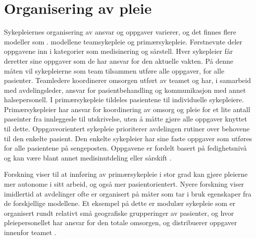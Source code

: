 \section{Organisering av pleie}
\label{sec:pleie}

Sykepleiernes organisering av ansvar og oppgaver varierer, og det finnes flere modeller som .  modellene teamsykepleie og primærsykepleie. Førstnevnte deler oppgavene inn i kategorier som medisinering og sårstell. Hver sykepleier får deretter sine oppgaver som de har ansvar for den aktuelle vakten. På denne måten vil sykepleierne som team tilsammen utføre alle oppgaver, for alle pasienter. Teamledere koordinerer omsorgen utført av teamet og har, i samarbeid med avdelingsleder, ansvar for pasientbehandling og kommunikasjon med annet halsepersonell. I primærsykepleie tildeles pasientene til individuelle sykepleiere. Primærsykepleier har ansvar for koordinering av omsorg og pleie for et lite antall paseinter fra innleggesle til utskrivelse, uten å måtte gjøre alle oppgaver knyttet til dette. Oppgaveorientert sykepleie prioriterer avdelingen rutiner over behovene til den enkelte pasient. Den enkelte sykepleier har sine faste oppgaver som utføres for alle pasientene på sengeposten. Oppgavene er fordelt basert på fedighetsnivå og kan være blant annet medisinutdeling eller sårskift \citep{Rygh13}.

\noindent
Forskning viser til at innføring av primærsykepleie i stor grad kan gjøre pleierne mer autonome i sitt arbeid, og også mer pasientorientert. Nyere forskning viser imidlertid at avdelinger ofte er organisert på måter som tar i bruk egenskaper fra de forskjellige modellene. Et eksempel på dette er modulær sykepleie som er organisert rundt relativt små geografiske grupperinger av pasienter, og hvor pleiepersonellet har ansvar for den totale omsorgen, og distribuerer oppgaver innenfor teamet \citep{Rygh13}.
